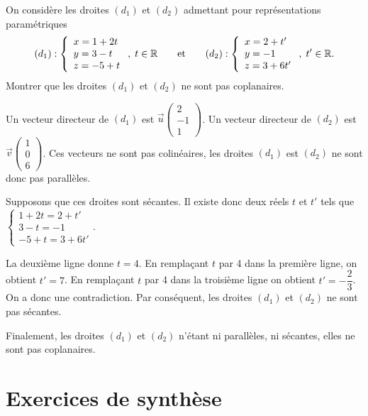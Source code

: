 \documentclass[11pt,fleqn, openany]{book} %
\begin{document}
\begin{exercise}
On considère les droites $(d_1)$ et $(d_2)$ admettant pour représentations paramétriques
 \[ (d_1) : \left\{\renewcommand{\arraystretch}{1}\begin{array}{l} x = 1 +2t \\ y = 3-t \\ z = -5+t

\end{array}\right. ,\; t\in \mathbb{R} \qquad \text{et}\qquad  (d_2) : \left\{\renewcommand{\arraystretch}{1}\begin{array}{l} x = 2+t' \\ y = -1 \\ z = 3+6t' 

\end{array}\right. ,\; t'\in \mathbb{R}.\] 
Montrer que les droites $(d_1)$ et $(d_2)$ ne sont pas coplanaires.
\end{exercise}

\begin{solution}Un vecteur directeur de $(d_1)$ est $\vec u \begin{pmatrix}2\\-1\\1\end{pmatrix}$. Un vecteur directeur de $(d_2)$ est $\vec v \begin{pmatrix}1\\0\\6\end{pmatrix}$. Ces vecteurs ne sont pas colinéaires, les droites $(d_1)$ est $(d_2)$ ne sont donc pas parallèles.

Supposons que ces droites sont sécantes. Il existe donc deux réels $t$ et $t'$ tels que $\left\{\begin{array}{l} 1 +2t =2+t' \\  3-t =-1\\ -5+t=3+6t'\end{array}\right.$.

La deuxième ligne donne $t=4$. En remplaçant $t$ par 4 dans la première ligne, on obtient $t'=7$. En remplaçant $t$ par 4 dans la troisième ligne on obtient $t'=-\dfrac{2}{3}$. On a donc une contradiction. Par conséquent, les droites $(d_1)$ et $(d_2)$ ne sont pas sécantes.

Finalement, les droites $(d_1)$ et $(d_2)$ n'étant ni parallèles, ni sécantes, elles ne sont pas coplanaires.\end{solution}


\section*{Exercices de synthèse}
\end{document}
